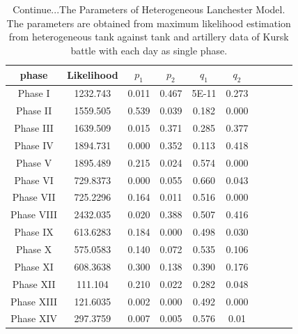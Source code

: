 \documentclass[]{article}
\begin{document}
\begin{table}
\centering
\tiny
\caption{Continue...The Parameters of Heterogeneous Lanchester Model. The parameters are obtained from maximum likelihood estimation from heterogeneous tank against tank and artillery data of Kursk battle with each day as single phase.}
{\begin{tabular}{|c|c|c|c|c|c|c|c|c|c|}   \hline\hline
phase & Likelihood  &	\bf${p_1}$&	\bf${p_2}$&	\bf${q_1}$&	\bf${q_2}$	 \\
\hline
\hline
Phase I &1232.743& 0.011& 0.467 &5E-11 &0.273\\
\hline
Phase II &1559.505 &0.539 &0.039 &0.182 &0.000\\
\hline
Phase III& 1639.509& 0.015 &0.371 &0.285 &0.377\\
\hline
Phase IV &1894.731& 0.000 &0.352 &0.113 &0.418\\
\hline
Phase V &1895.489 &0.215 &0.024 &0.574 &0.000\\
\hline
Phase VI &729.8373 &0.000 &0.055 &0.660& 0.043\\
\hline
Phase VII &725.2296 &0.164& 0.011 &0.516& 0.000\\
\hline
Phase VIII& 2432.035 &0.020& 0.388 &0.507& 0.416\\
\hline
Phase IX &613.6283 &0.184& 0.000 &0.498& 0.030\\
\hline
Phase X &575.0583 &0.140 &0.072& 0.535 &0.106\\
\hline
Phase XI &608.3638 &0.300 &0.138 &0.390 &0.176\\
\hline
Phase XII &111.104 &0.210 &0.022 &0.282 &0.048\\
\hline
Phase XIII &121.6035 &0.002 &0.000 &0.492 &0.000\\
\hline
Phase XIV &297.3759 &0.007 &0.005 &0.576 &0.01\\
\hline
\hline
\end{tabular}}
\end{table}
\end{document}
